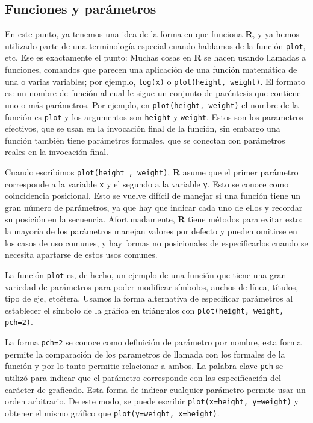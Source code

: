 \documentclass[spanish]{extbook}
\numberwithin{equation}{section}
\numberwithin{figure}{section}
\begin{document}
\subsection{Funciones y parámetros}

En este punto, ya tenemos una idea de la forma en que funciona \textbf{R}, y ya
hemos utilizado parte de una terminología especial cuando hablamos de la
función \texttt{plot}, etc. Ese es exactamente el punto: Muchas cosas en
\textbf{R} se hacen usando llamadas a funciones, comandos que parecen una
aplicación de una función matemática de una o varias variables; por ejemplo,
\texttt{log(x)} o \texttt{plot(height, weight)}. El formato es: un nombre de
función al cual le sigue un conjunto de paréntesis que contiene uno o más
parámetros. Por ejemplo, en \texttt{plot(height, weight)} el nombre de la
función es \texttt{plot} y los argumentos son \texttt{height} y
\texttt{weight}.  Estos son los parametros efectivos, que se usan en la
invocación final de la función, sin embargo una función también tiene
parámetros formales, que se conectan con parámetros reales en la invocación
final.

Cuando escribimos \texttt{plot(height , weight)}, \textbf{R} asume que el primer
parámetro corresponde a la variable \texttt{x} y el segundo a la variable
\texttt{y}. Esto se conoce como coincidencia posicional. Esto se vuelve difícil
de manejar si una función tiene un gran número de parámetros, ya que hay que
indicar cada uno de ellos y recordar su posición en la secuencia.
Afortunadamente, \textbf{R} tiene métodos para evitar esto: la mayoría de los
parámetros manejan valores por defecto y pueden omitirse en los casos de uso
comunes, y hay formas no posicionales de especificarlos cuando se necesita
apartarse de estos usos comunes.

La función \texttt{plot} es, de hecho, un ejemplo de una función que tiene una
gran variedad de parámetros para poder modificar símbolos, anchos de línea,
títulos, tipo de eje, etcétera. Usamos la forma alternativa de especificar
parámetros al establecer el símbolo de la gráfica en triángulos con
\texttt{plot(height, weight, pch=2)}. 

La forma \texttt{pch=2} se conoce como definición de parámetro por nombre, esta
forma permite la comparación de los parametros de llamada con los formales de
la función y por lo tanto permitie relacionar a ambos. La palabra clave
\texttt{pch} se utilizó para indicar que el parámetro corresponde con las
especificación del carácter de graficado. Esta forma de indicar cualquier
parámetro permite usar un orden arbitrario. De este modo, se puede escribir
\texttt{plot(x=height, y=weight)} y obtener el mismo gráfico que
\texttt{plot(y=weight, x=height)}.  
\end{document}
